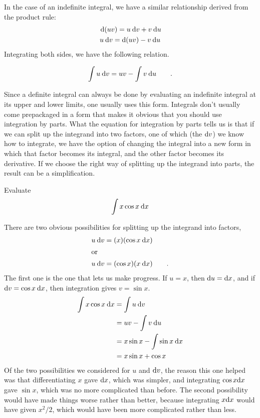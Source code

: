 In the case of an indefinite integral, we have a similar relationship
derived from the product rule:
\begin{gather*}
  \:\textup{d}(uv) = u \:\textup{d} v + v \:\textup{d} u \\
  u \:\textup{d} v = \textup{d}(uv) - v \:\textup{d} u \\
\end{gather*}
Integrating both sides, we have the following relation.
\begin{important}
\begin{equation*}
  \int u \:\textup{d} v = uv - \int v \:\textup{d} u \qquad .
\end{equation*}
\end{important}
Since a definite integral can always be done by evaluating an indefinite
integral at its upper and lower limits, one usually uses this form.
Integrals don't usually come prepackaged in a form that makes it
obvious that you should use integration by parts. What the equation for
integration by parts tells us is that if we can split up the integrand
into two factors, one of which (the $\textup{d} v$) we know how to integrate, we have
the option of changing the integral into a new form in which that factor
becomes its integral, and the other factor becomes its derivative. If we
choose the right way of splitting up the integrand into parts, the result can be
a simplification.

\begin{eg}
\egquestion Evaluate
\begin{equation*}
  \int x \cos x \:\textup{d} x
\end{equation*}

\egquestion There are two obvious possibilities for splitting up the integrand
into factors,
\begin{align*}
  u \:\textup{d} v &= (x)(\cos x\:\textup{d} x) \\
\intertext{or}
  u \:\textup{d} v &= (\cos x)(x\:\textup{d} x) \qquad .
\end{align*}
The first one is the one that lets us make progress. If $u=x$, then
$\textup{d} u=\textup{d} x$, and if $\textup{d} v=\cos x\:\textup{d} x$, then integration
gives $v=\sin x$.
\begin{align*}
  \int x \cos x \:\textup{d} x &= \int u \:\textup{d} v \\
                       &= uv - \int v \:\textup{d} u \\
                       &= x\sin x-\int \sin x \:\textup{d} x \\
                       &= x\sin x+\cos x
\end{align*}
Of the two possibilities we considered for $u$ and $\textup{d} v$, the reason
this one helped was that differentiating $x$ gave $\textup{d} x$, which was
simpler, and integrating $\cos x\textup{d} x$ gave $\sin x$, which was no
more complicated than before. The second possibility would have made
things worse rather than better, because integrating $x\textup{d} x$ would
have given $x^2/2$, which would have been more complicated rather than
less.
\end{eg}

